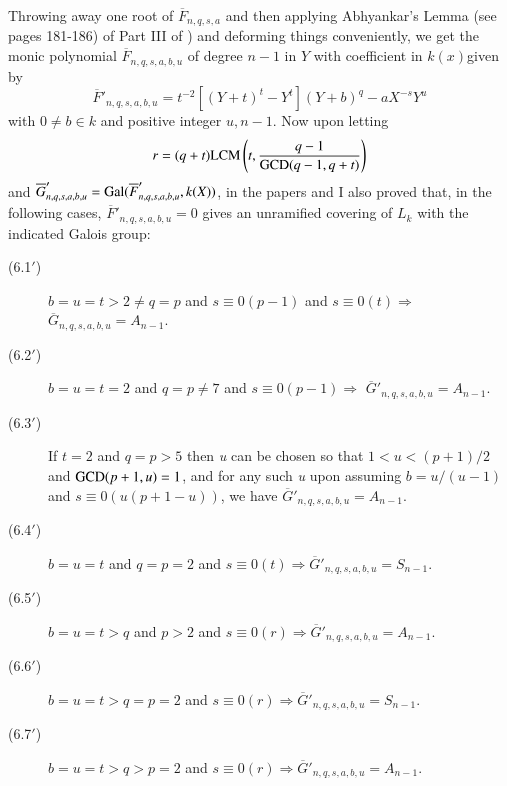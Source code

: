 Throwing away one root of $\overline{F}_{n,q,s,a}$ and then applying Abhyankar's Lemma (see pages 181-186) of Part III of \cite{chap1-key4}) and deforming things conveniently, we get the monic polynomial $\overline{F}_{n,q,s,a,b,u}$ of degree $n-1$ in $Y$ with coefficient in $k(x)$\pageoriginale given by
$$
\overline{F}'_{n,q,s,a,b,u}=t^{-2}\left[(Y+t)^t-Y^{t}\right](Y+b)^q-aX^{-s}Y^{u}
$$
with $0 \neq b \in k$ and positive integer $u,n-1$. Now upon letting
$$
r=(q+t){\rm LCM} \left(t,\dfrac{q-1}{\operatorname{GCD} (q-1, q+t)}\right)
$$
and $\overline{G}'_{n,q,s,a,b,u} = \operatorname{Gal}(\overline{F}'_{n,q,s,a,b,u}, k(X))$, in the papers \cite{chap1-key8} and \cite{chap1-key10} I also proved that, in the following cases, $\overline{F}'_{n,q,s,a,b,u}=0$ gives an unramified covering of $L_{k}$ with the indicated Galois group:
\begin{description}
\item[{\rm (6.1$'$)}]$b = u = t > 2 \neq q = p$ and $s \equiv 0(p-1)$ and $s \equiv 0(t) \Rightarrow$ $\overline{G}_{n,q,s,a,b,u} = A_{n-1}$.
\item[{\rm (6.2$'$)}] $b = u = t = 2$ and $q = p \neq 7$ and $s\equiv 0(p-1) \Rightarrow$
 $\overline{G}'_{n,q,s,a,b,u} = A_{n-1}$.
\item[{\rm (6.3$'$)}] If $t =2$ and $q = p > 5$ then {\it u} can be chosen so that $1<u<(p+1)/2$ 
and $\operatorname{GCD}(p+1,u)=1$, and for any such {\it u} upon assuming
$b=u/(u-1)$ and $s \equiv 0(u(p+1-u))$, we have $\overline{G}'_{n,q,s,a,b,u} =A_{n-1}$.
\item[{\rm (6.4$'$)}] $b=u=t$ and $q=p=2$ and $s\equiv 0(t) \Rightarrow \overline{G}'_{n,q,s,a,b,u} = S_{n-1}$.
\item[{\rm (6.5$'$)}] $b = u = t > q$ and $p > 2$ and $s \equiv 0(r)\Rightarrow \overline{G}'_{n,q,s,a,b,u} = A_{n-1}$.
\item[{\rm (6.6$'$)}] $b = u = t > q = p = 2$ and $s \equiv 0(r)\Rightarrow \overline{G}'_{n,q,s,a,b,u} = S_{n-1}$.
\item[{\rm (6.7$'$)}] $b = u = t > q > p = 2$ and $s \equiv 0(r)\Rightarrow \overline{G}'_{n,q,s,a,b,u} = A_{n-1}$.
\end{description}

